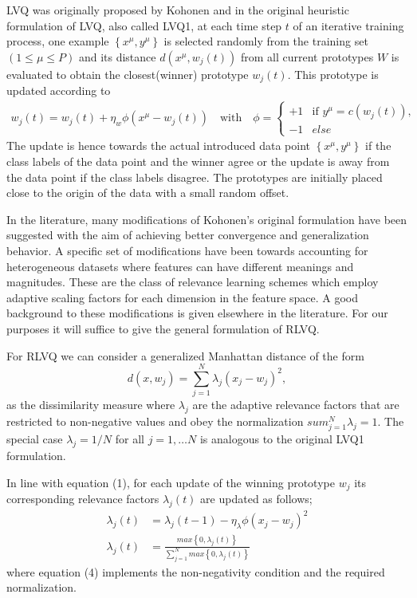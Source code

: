 \documentclass{esannV2}
\begin{document}
LVQ was originally proposed by Kohonen and in the original heuristic formulation of LVQ, also called LVQ1\cite{02}, at each time step $t$ of an iterative training process, one example $\left\{x^\mu, y^\mu\right\}$ is selected randomly from the training set $(1 \leq \mu \leq P)$ and its distance $d(x^\mu,w_j(t))$  from all current prototypes $W$ is evaluated to obtain the closest(winner) prototype $w_j(t)$. This prototype is updated according to
%
\begin{align} 
w_j(t) = w_j(t) + \eta_w \phi (x^\mu - w_j(t)) \quad \text{with} \quad
\phi = \begin{cases}
+1& \text{if $y^\mu = c(w_j(t))$},\\
-1& else 
\end{cases}
\end{align}
%
The update is hence towards the actual introduced data point $\left\{x^\mu, y^\mu\right\}$ if the class labels of the data point and the winner agree or the update is away from the data point if the class labels disagree. The prototypes are initially placed close to the origin of the data with a small random offset.

In the literature, many modifications of Kohonen's original formulation have been suggested with the aim of achieving better convergence and generalization behavior. A specific set of modifications have been towards accounting for heterogeneous datasets where features can have different meanings and magnitudes. These are the class of relevance learning schemes which employ adaptive scaling factors for each dimension in the feature space. A good background to these modifications is given elsewhere in the literature\cite{09,10,11}. For our purposes it will suffice to give the general formulation of RLVQ.

For RLVQ we can consider a generalized Manhattan distance of the form
%
\begin{equation} 
d(x,w_j) = \sum^N_{j=1} \lambda_j (x_j - w_j)^2 ,
\end{equation}
%
as the dissimilarity measure where $\lambda_j$ are the adaptive relevance factors that are restricted to non-negative values and obey the normalization $sum^N_{j=1} \lambda_j = 1$. The special case $\lambda_j = 1/N$ for all $j = 1,\ldots N$ is analogous to the original LVQ1 formulation.

In line with equation (1), for each update of the winning prototype $w_j$ its corresponding relevance factors $\lambda_j(t)$ are updated as follows;
%
\begin{align}
\lambda_j(t) &= \lambda_j(t-1) - \eta_\lambda \phi (x_j - w_j)^2 \\
\lambda_j(t) &= \frac{max\left\{0,\lambda_j(t)\right\}}{\sum^N_{j=1} max\left\{0,\lambda_j(t)\right\}}
\end{align}
%
where equation (4) implements the non-negativity condition and the required normalization.
\end{document}
